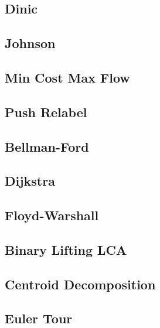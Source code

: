 \subsection{Dinic}
\raggedbottom
\hrulefill
\subsection{Johnson}
\raggedbottom
\hrulefill
\subsection{Min Cost Max Flow}
\raggedbottom
\hrulefill
\subsection{Push Relabel}
\raggedbottom
\hrulefill
\subsection{Bellman-Ford}
\raggedbottom
\hrulefill
\subsection{Dijkstra}
\raggedbottom
\hrulefill
\subsection{Floyd-Warshall}
\raggedbottom
\hrulefill
\subsection{Binary Lifting LCA}
\raggedbottom
\hrulefill
\subsection{Centroid Decomposition}
\raggedbottom
\hrulefill
\subsection{Euler Tour}
\raggedbottom
\hrulefill
